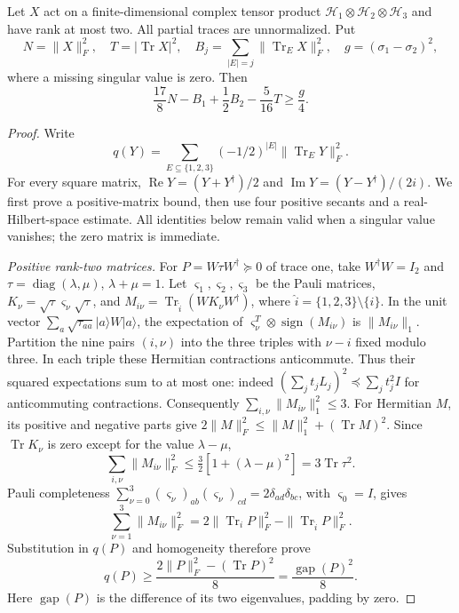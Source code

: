 \begin{lemma}\label{lem:aux}
Let $X$ act on a finite-dimensional complex tensor product
$\mathcal H_1\otimes\mathcal H_2\otimes\mathcal H_3$ and have rank at most two.
All partial traces are unnormalized. Put
\[
 N=\|X\|_F^2,\quad T=|\operatorname{Tr}X|^2,\quad
 B_j=\sum_{|E|=j}\|\operatorname{Tr}_E X\|_F^2,\quad
 g=(\sigma_1-\sigma_2)^2,
\]
where a missing singular value is zero. Then
\[
 \frac{17}{8}N-B_1+\frac12B_2-\frac5{16}T\ge\frac g4.
\]
\end{lemma}

\begin{proof}
Write
\[
q(Y)=\sum_{E\subseteq\{1,2,3\}}(-1/2)^{|E|}
                 \|\operatorname{Tr}_E Y\|_F^2.
\]
For every square matrix, $\operatorname{Re}Y=(Y+Y^\dagger)/2$ and
$\operatorname{Im}Y=(Y-Y^\dagger)/(2i)$.
We first prove a positive-matrix bound, then use four positive secants and
a real-Hilbert-space estimate. All identities below remain valid when a
singular value vanishes; the zero matrix is immediate.

\smallskip\noindent\emph{Positive rank-two matrices.}
For $P=W\tau W^\dagger\succeq0$ of trace one, take $W^\dagger W=I_2$ and
$\tau=\operatorname{diag}(\lambda,\mu)$, $\lambda+\mu=1$.
Let $\varsigma_1,\varsigma_2,\varsigma_3$ be the Pauli matrices,
$K_\nu=\sqrt\tau\varsigma_\nu\sqrt\tau$, and
$M_{i\nu}=\operatorname{Tr}_{\widehat i}(WK_\nu W^\dagger)$, where
$\widehat i=\{1,2,3\}\setminus\{i\}$.
In the unit vector $\sum_a\sqrt{\tau_{aa}}|a\rangle W|a\rangle$, the expectation
of $\varsigma_\nu^T\otimes\operatorname{sign}(M_{i\nu})$ is
$\|M_{i\nu}\|_1$. Partition the nine pairs $(i,\nu)$ into the three triples
with $\nu-i$ fixed modulo three. In each triple these Hermitian contractions
anticommute. Thus their squared expectations sum to at most one:
indeed $(\sum_jt_jL_j)^2\preceq\sum_jt_j^2 I$ for anticommuting contractions.
Consequently $\sum_{i,\nu}\|M_{i\nu}\|_1^2\le3$.
For Hermitian $M$, its positive and negative parts give
$2\|M\|_F^2\le\|M\|_1^2+(\operatorname{Tr}M)^2$.
Since $\operatorname{Tr}K_\nu$ is zero except for the value $\lambda-\mu$,
\[
 \sum_{i,\nu}\|M_{i\nu}\|_F^2
       \le\tfrac32[1+(\lambda-\mu)^2]=3\operatorname{Tr}\tau^2.
\]
Pauli completeness
$\sum_{\nu=0}^3(\varsigma_\nu)_{ab}(\varsigma_\nu)_{cd}
=2\delta_{ad}\delta_{bc}$, with $\varsigma_0=I$, gives
\[
 \sum_{\nu=1}^3\|M_{i\nu}\|_F^2
 =2\|\operatorname{Tr}_iP\|_F^2
     -\|\operatorname{Tr}_{\widehat i}P\|_F^2.
\]
Substitution in $q(P)$ and homogeneity therefore prove
\begin{equation}
 q(P)\ge\frac{2\|P\|_F^2-(\operatorname{Tr}P)^2}{8}
       =\frac{\operatorname{gap}(P)^2}{8}.
 \label{eq:psdfloor}
\end{equation}
Here $\operatorname{gap}(P)$ is the difference of its two eigenvalues,
padding by zero.


\end{proof}
